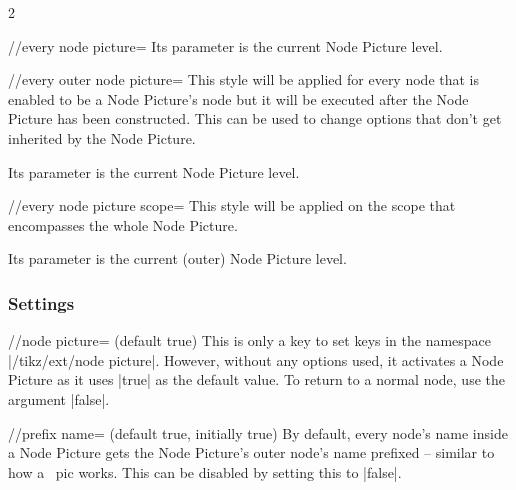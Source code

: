 \begin{multicols*}{2}
\begin{stylekey}{/\tikzext/every node picture=}
  Its parameter is the current Node Picture level.
\end{stylekey}
\begin{stylekey}{/\tikzext/every outer node picture=}
  This style will be applied for every node that is enabled to be a Node Picture's node
  but it will be executed after the Node Picture has been constructed.
  This can be used to change options that don't get inherited by the Node Picture.

  Its parameter is the current Node Picture level.
\end{stylekey}
\begin{stylekey}{/\tikzext/every node picture scope=}
  This style will be applied on the scope that encompasses the whole Node Picture.
  
  Its parameter is the current (outer) Node Picture level.
\end{stylekey}

\subsubsection{Settings}
\begin{key}{/\tikzext/node picture= (default true)}
  This is only a key to set keys in the namespace |/tikz/ext/node picture|.
  However, without any options used, it activates a Node Picture as it uses |true| as the default value.
  To return to a normal node, use the argument |false|.
\end{key}
\begin{key}{/\tikzextnp/prefix name= (default true, initially true)}
  By default, every node's name inside a Node Picture gets the Node Picture's outer node's name prefixed --
  similar to how a \tikzname\ pic works.
  This can be disabled by setting this to |false|.
  

\end{key}
\end{multicols*}
